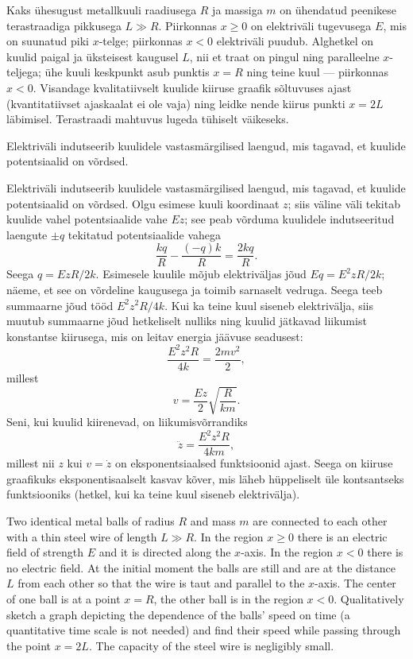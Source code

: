 
Kaks ühesugust metallkuuli raadiusega $R$ ja massiga $m$ on ühendatud peenikese terastraadiga pikkusega $L\gg R$. Piirkonnas $x\ge 0$ on elektriväli tugevusega $E$, mis on suunatud piki $x$-telge; piirkonnas $x< 0$ elektriväli puudub. Alghetkel on kuulid paigal ja üksteisest kaugusel $L$, nii et traat on pingul ning paralleelne $x$-teljega; ühe kuuli keskpunkt asub punktis $x=R$ ning teine kuul --- piirkonnas $x<0$. Visandage kvalitatiivselt kuulide kiiruse graafik sõltuvuses ajast (kvantitatiivset ajaskaalat ei ole vaja) ning leidke nende kiirus punkti $x=2L$ läbimisel. Terastraadi mahtuvus lugeda tühiselt väikeseks.

\hint
Elektriväli indutseerib kuulidele vastasmärgilised laengud, mis tagavad, et kuulide potentsiaalid on võrdsed.

\solu
Elektriväli indutseerib kuulidele vastasmärgilised laengud, mis tagavad, et kuulide potentsiaalid on võrdsed. Olgu esimese kuuli koordinaat $z$; siis väline väli tekitab kuulide vahel potentsiaalide vahe $Ez$; see peab võrduma kuulidele indutseeritud laengute $\pm q$ tekitatud potentsiaalide vahega
\[
\frac{kq}{R}-\frac{(-q)k}{R}=\frac{2kq}{R}.
\]
Seega $q=EzR/2k$. Esimesele kuulile mõjub elektriväljas jõud $Eq=E^2zR/2k$; näeme, et see on võrdeline kaugusega ja toimib sarnaselt vedruga. Seega teeb summaarne jõud tööd $E^2z^2R/4k$. Kui ka teine kuul siseneb elektrivälja, siis muutub summaarne jõud hetkeliselt nulliks ning kuulid jätkavad liikumist konstantse kiirusega, mis on leitav energia jäävuse seadusest: 
\[
\frac{E^2z^2R}{4k}=\frac{2mv^2}{2},
\]
millest
\[
v=\frac{Ez}{2}\sqrt{\frac{R}{km}}.
\]
Seni, kui kuulid kiirenevad, on liikumisvõrrandiks
\[
\ddot z=\frac{E^2z^2R}{4km},
\]
millest nii $z$ kui $v=\dot z$ on eksponentsiaalsed funktsioonid ajast. Seega on kiiruse graafikuks eksponentisaalselt kasvav kõver, mis läheb hüppeliselt üle kontsantseks funktsiooniks (hetkel, kui ka teine kuul siseneb elektrivälja).

Two identical metal balls of radius $R$ and mass $m$ are connected to each other with a thin steel wire of length $L\gg R$. In the region $x\ge 0$ there is an electric field of strength $E$ and it is directed along the $x$-axis. In the region $x< 0$ there is no electric field. At the initial moment the balls are still and are at the distance $L$ from each other so that the wire is taut and parallel to the $x$-axis. The center of one ball is at a point $x=R$, the other ball is in the region $x<0$. Qualitatively sketch a graph depicting the dependence of the balls’ speed on time (a quantitative time scale is not needed) and find their speed while passing through the point $x=2L$. The capacity of the steel wire is negligibly small.

